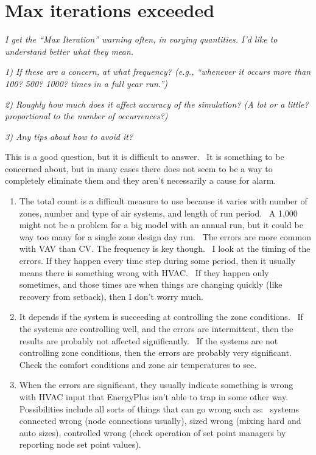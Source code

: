 \section{Max iterations exceeded}\label{max-iterations-exceeded}

\emph{I get the ``Max Iteration'' warning often, in varying quantities. I'd like to understand better what they mean.~}

\emph{1) If these are a concern, at what frequency? (e.g., ``whenever it occurs more than 100? 500? 1000? times in a full year run.'')}

\emph{2) Roughly how much does it affect accuracy of the simulation? (A lot or a little? proportional to the number of occurrences?)}

\emph{3) Any tips about how to avoid it?}

This is a good question, but it is difficult to answer.~ It is something to be concerned about, but in many cases there does not seem to be a way to completely eliminate them and they aren't necessarily a cause for alarm.

\begin{enumerate}
\def\labelenumi{\arabic{enumi})}
\item
  The total count is a difficult measure to use because it varies with number of zones, number and type of air systems, and length of run period.~ A 1,000 might not be a problem for a big model with an annual run, but it could be way too many for a single zone design day run.~ The errors are more common with VAV than CV. The frequency is key though.~ I look at the timing of the errors. If they happen every time step during some period, then it usually means there is something wrong with HVAC.~ If they happen only sometimes, and those times are when things are changing quickly (like recovery from setback), then I don't worry much.
\item
  It depends if the system is succeeding at controlling the zone conditions.~ If the systems are controlling well, and the errors are intermittent, then the results are probably not affected significantly.~ If the systems are not controlling zone conditions, then the errors are probably very significant.~ Check the comfort conditions and zone air temperatures to see.
\item
  When the errors are significant, they usually indicate something is wrong with HVAC input that EnergyPlus isn't able to trap in some other way.~ Possibilities include all sorts of things that can go wrong such as:~ systems connected wrong (node connections usually), sized wrong (mixing hard and auto sizes), controlled wrong (check operation of set point managers by reporting node set point values).
\end{enumerate}
